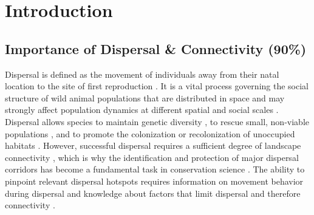 \documentclass[abstract=on,10pt,a4paper,bibliography=totocnumbered]{article}
\begin{document}
\begin{abstract}
\end{abstract}

\newpage

\onehalfspacing
\tableofcontents
\doublespacing

\newpage
{}


\section{Introduction}

\subsection{Importance of Dispersal \& Connectivity (90\%)}
Dispersal is defined as the movement of individuals away from their natal
location to the site of first reproduction \cite{Howard.1960}. It is a vital
process governing the social structure of wild animal populations that are
distributed in space \citep{Hanski.1998, Clobert.2012} and may strongly affect
population dynamics at different spatial and social scales \citep{Hanski.1999a,
Clobert.2012}. Dispersal allows species to maintain genetic diversity
\citep{Perrin.1999, Perrin.2000, Frankham.2002, Leigh.2012, Baguette.2013}, to
rescue small, non-viable populations \citep{Brown.1977}, and to promote the
colonization or recolonization of unoccupied habitats \citep{Hanski.1999b,
MacArthur.2001}. However, successful dispersal requires a sufficient degree of
landscape connectivity \citep{Fahrig.2003, Clobert.2012}, which is why the
identification and protection of major dispersal corridors has become a
fundamental task in conservation science \citep{Nathan.2008, Doerr.2011,
Rudnick.2012}. The ability to pinpoint relevant dispersal hotspots requires
information on movement behavior during dispersal and knowledge about factors
that limit dispersal and therefore connectivity \citep{Baguette.2013,
Vasudev.2015}.

\end{document}

